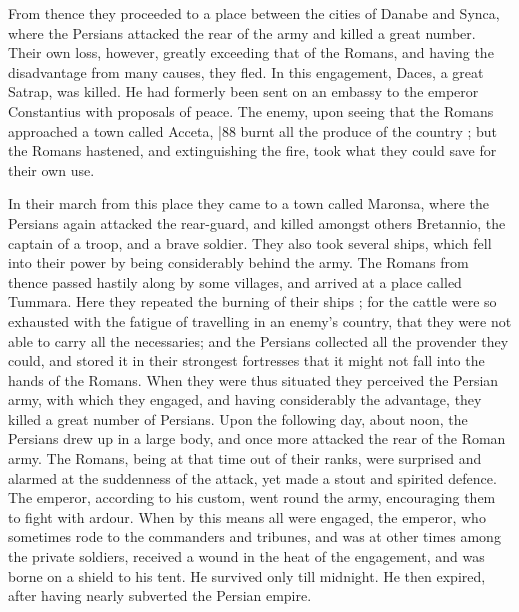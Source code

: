 From thence they proceeded to a place between the cities of Danabe and Synca, where the Persians attacked the rear of the army and killed a great number. Their own loss, however, greatly exceeding that of the Romans, and having the disadvantage from many causes, they fled. In this engagement, Daces, a great Satrap, was killed. He had formerly been sent on an embassy to the emperor Constantius with proposals of peace. The enemy, upon seeing that the Romans approached a town called Acceta,
|88 burnt all the produce of the country ; but the Romans hastened, and extinguishing the fire, took what they could save for their own use.

In their march from this place they came to a town called Maronsa, where the Persians again attacked the rear-guard, and killed amongst others Bretannio, the captain of a troop, and a brave soldier. They also took several ships, which fell into their power by being considerably behind the army. The Romans from thence passed hastily along by some villages, and arrived at a place called Tummara. Here they repeated the burning of their ships ; for the cattle were so exhausted with the fatigue of travelling in an enemy's country, that they were not able to carry all the necessaries; and the Persians collected all the provender they could, and stored it in their strongest fortresses that it might
not fall into the hands of the Romans. When they were thus situated they perceived the Persian army, with which they engaged, and having considerably the advantage, they killed a great number of Persians. Upon the following day, about noon, the
Persians drew up in a large body, and once more attacked the rear of the Roman army. The Romans, being at that time out of their ranks, were surprised and alarmed at the suddenness of the attack, yet made a stout and spirited defence. The emperor, according to his custom, went round the army, encouraging them to fight with ardour. When by this means all were engaged, the emperor, who sometimes rode to the commanders and tribunes, and
was at other times among the private soldiers, received a wound in the heat of the engagement, and was borne on a shield to his tent. He survived only till midnight. He then expired, after having nearly subverted the Persian empire.

